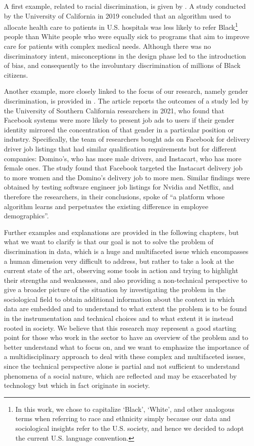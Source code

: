 A first example, related to racial discrimination, is given by \cite{ledford2019millions}. A study conducted by the University of California in 2019 concluded that an algorithm used to allocate health care to patients in U.S. hospitals was less likely to refer Black\footnote{In this work, we chose to capitalize `Black', `White', and other analogous terms when referring to race and ethnicity simply because our data and sociological insights refer to the U.S. society, and hence we decided to adopt the current U.S. language convention.} people than White people who were equally sick to programs that aim to improve care for patients with complex medical needs. Although there was no discriminatory intent, misconceptions in the design phase led to the introduction of bias, and consequently to the involuntary discrimination of millions of Black citizens.

Another example, more closely linked to the focus of our research, namely gender discrimination, is provided in \cite{horwitz2021facebook}. The article reports the outcomes of a study led by the University of Southern California researchers in 2021, who found that Facebook systems were more likely to present job ads to users if their gender identity mirrored the concentration of that gender in a particular position or industry. Specifically, the team of researchers bought ads on Facebook for delivery driver job listings that had similar qualification requirements but for different companies: Domino's, who has more male drivers, and Instacart, who has more female ones. The study found that Facebook targeted the Instacart delivery job to more women and the Domino's delivery job to more men. Similar findings were obtained by testing software engineer job listings for Nvidia and Netflix, and therefore the researchers, in their conclusions, spoke of ``a platform whose algorithm learns and perpetuates the existing difference in employee demographics''.

Further examples and explanations are provided in the following chapters, but what we want to clarify is that our goal is not to solve the problem of discrimination in data, which is a huge and multifaceted issue which encompasses a human dimension very difficult to address, but rather to take a look at the current state of the art, observing some tools in action and trying to highlight their strengths and weaknesses, and also providing a non-technical perspective to give a broader picture of the situation by investigating the problem in the sociological field to obtain additional information about the context in which data are embedded and to understand to what extent the problem is to be found in the instrumentation and technical choices and to what extent it is instead rooted in society.
We believe that this research may represent a good starting point for those who work in the sector to have an overview of the problem and to better understand what to focus on, and we want to emphasize the importance of a multidisciplinary approach to deal with these complex and multifaceted issues, since the technical perspective alone is partial and not sufficient to understand phenomena of a social nature, which are reflected and may be exacerbated by technology but which in fact originate in society.


